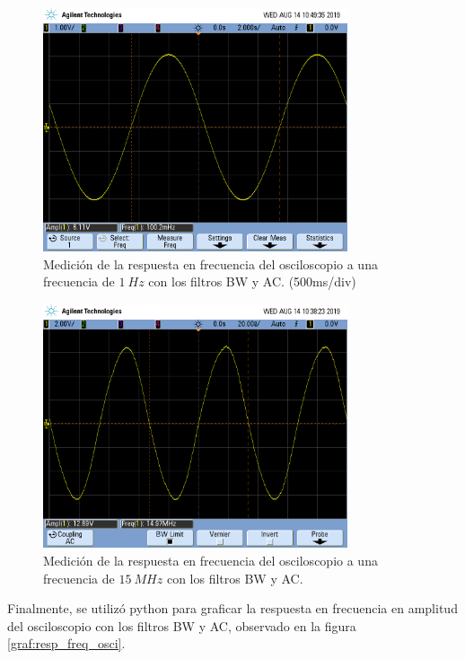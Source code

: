 \documentclass[a4paper]{article}
\begin{document}
\begin{figure}[H]
	\centering
	\includegraphics[width=0.8\textwidth,trim={0.5cm 2cm  0.5 5cm},clip]{osci100mhz.png}
	\caption{Medición de la respuesta en frecuencia del osciloscopio a una frecuencia de $1 \ Hz$ con los filtros BW y AC. (500ms/div)} 
	\label{graf:osci_freq_baja}
\end{figure}

\begin{figure}[H]
	\centering
	\includegraphics[width=0.8\textwidth,trim={0.5cm 2cm  0.5 5cm},clip]{osci15Mhz.png}
	\caption{Medición de la respuesta en frecuencia del osciloscopio a una frecuencia de $15 \ MHz$ con los filtros BW y AC.} 
	\label{graf:osci_freq_alta}
\end{figure}


Finalmente, se utilizó python para graficar la respuesta en frecuencia en amplitud del osciloscopio con los filtros BW y AC, observado en la figura \ref{graf:resp_freq_osci}.
\end{document}

